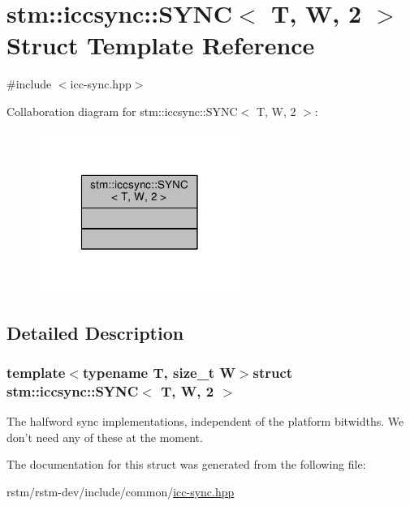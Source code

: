 \hypertarget{structstm_1_1iccsync_1_1SYNC_3_01T_00_01W_00_012_01_4}{\section{stm\-:\-:iccsync\-:\-:S\-Y\-N\-C$<$ T, W, 2 $>$ Struct Template Reference}
\label{structstm_1_1iccsync_1_1SYNC_3_01T_00_01W_00_012_01_4}
}


{\ttfamily \#include $<$icc-\/sync.\-hpp$>$}



Collaboration diagram for stm\-:\-:iccsync\-:\-:S\-Y\-N\-C$<$ T, W, 2 $>$\-:
\nopagebreak
\begin{figure}[H]
\begin{center}
\leavevmode
\includegraphics[width=186pt]{structstm_1_1iccsync_1_1SYNC_3_01T_00_01W_00_012_01_4__coll__graph}
\end{center}
\end{figure}


\subsection{Detailed Description}
\subsubsection*{template$<$typename T, size\-\_\-t W$>$struct stm\-::iccsync\-::\-S\-Y\-N\-C$<$ T, W, 2 $>$}

The halfword sync implementations, independent of the platform bitwidths. We don't need any of these at the moment. 

The documentation for this struct was generated from the following file\-:\begin{DoxyCompactItemize}
\item 
rstm/rstm-\/dev/include/common/\hyperlink{icc-sync_8hpp}{icc-\/sync.\-hpp}\end{DoxyCompactItemize}
